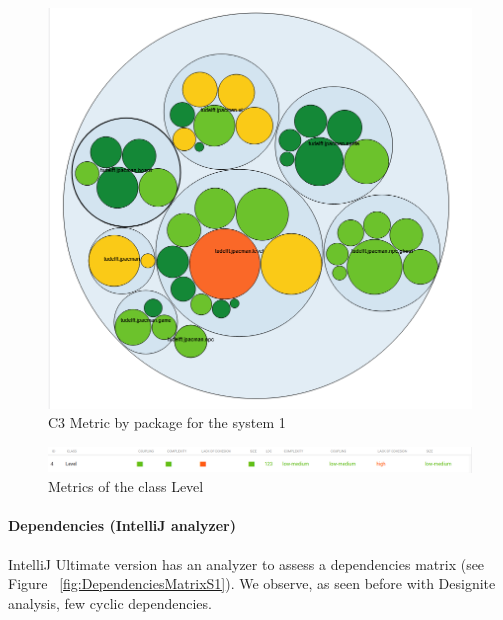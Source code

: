 \documentclass[]{article}
\begin{document}
\begin{figure}
    \centering
    \includegraphics[scale=0.5]{imgs/CodeMRByPackage.PNG}
    \caption{C3 Metric by package for the system 1}
    \label{fig:CodeMRByPackage}
\end{figure}

\begin{figure}
    \centering
    \includegraphics[width=\linewidth]{imgs/CodeMRLevelMetrics.PNG}
    \caption{Metrics of the class Level}
    \label{fig:CodeMRLevelClassQuality}
\end{figure}

\paragraph{Dependencies (IntelliJ analyzer)}

IntelliJ Ultimate version has an analyzer to assess a dependencies matrix (see Figure ~\ref{fig:DependenciesMatrixS1}). We observe, as seen before with Designite analysis, few cyclic dependencies.
\end{document}
